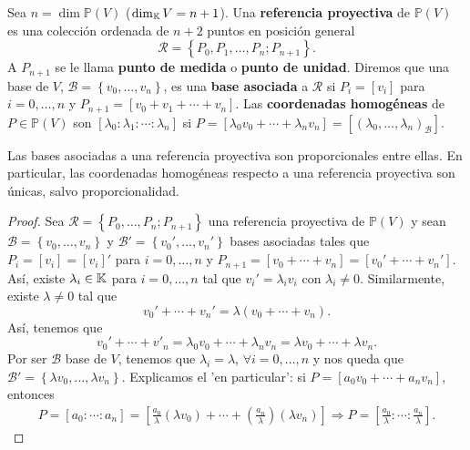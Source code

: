 \begin{definition}
Sea $\displaystyle n = \dim \mathbb{P}\left(V\right) $ ($\displaystyle \dim_{\mathbb{K}}V = n +1 $). Una \textbf{referencia proyectiva} de $\displaystyle \mathbb{P}\left(V\right) $ es una colección ordenada de $\displaystyle n + 2 $ puntos en posición general
\[\mathcal{R} = \left\{ P_{0}, P_{1}, \ldots, P_{n}; P_{n+1}\right\}  .\]
A $\displaystyle P_{n+1} $ se le llama \textbf{punto de medida} o \textbf{punto de unidad}. Diremos que una base de $\displaystyle V $, $\displaystyle \mathcal{B}= \left\{ v_{0}, \ldots, v_{n}\right\}  $, es una \textbf{base asociada} a $\displaystyle \mathcal{R} $ si $\displaystyle P_{i} = [v_{i}] $ para $\displaystyle  i = 0, \ldots, n $ y $\displaystyle P_{n+1} = \left[v_{0}+v_{1} + \cdots + v_{n}\right]  $. Las \textbf{coordenadas homogéneas} de $\displaystyle P \in \mathbb{P}\left(V\right) $ son $\displaystyle \left[\lambda_{0} : \lambda_{1} : \cdots : \lambda_{n}\right]  $ si $\displaystyle P = \left[\lambda_{0}v_{0}+\cdots + \lambda_{n}v_{n}\right] = [\left(\lambda_{0}, \ldots, \lambda_{n}\right)_{\mathcal{B}}]  $. 
\end{definition}
\begin{lema}
Las bases asociadas a una referencia proyectiva son proporcionales entre ellas. En particular, las coordenadas homogéneas respecto a una referencia proyectiva son únicas, salvo proporcionalidad. 
\end{lema}
\begin{proof}
	Sea $\displaystyle \mathcal{R} = \left\{ P_{0}, \ldots, P_{n}; P_{n+1}\right\}  $ una referencia proyectiva de $\displaystyle \mathbb{P}\left(V\right) $ y sean $\displaystyle \mathcal{B} = \left\{ v_{0}, \ldots, v_{n}\right\}  $ y $\displaystyle \mathcal{B}' = \left\{ v_{0}', \ldots, v_{n}'\right\}  $ bases asociadas tales que $\displaystyle P_{i} = \left[v_{i}\right]  = \left[v_{i}\right] ' $ para $\displaystyle i = 0, \ldots, n $ y $\displaystyle P_{n+1} = \left[v_{0}+\cdots + v_{n}\right] = \left[v_{0}' + \cdots + v_{n}'\right]  $. 
	Así, existe $\displaystyle \lambda_{i} \in \mathbb{K} $ para $\displaystyle i = 0, \ldots, n $ tal que $\displaystyle v_{i}' = \lambda_{i}v_{i} $ con $\displaystyle \lambda_{i} \neq 0 $. Similarmente, existe $\displaystyle \lambda\neq 0 $ tal que 
	\[v_{0}' + \cdots + v_{n}' = \lambda\left(v_{0} + \cdots + v_{n}\right) .\]
Así, tenemos que
\[v_{0}' + \cdots + v'_{n} = \lambda_{0}v_{0} + \cdots + \lambda_{n}v_{n} = \lambda v_{0} + \cdots + \lambda v_{n}.\]
Por ser $\displaystyle \mathcal{B} $ base de $\displaystyle V $, tenemos que $\displaystyle \lambda_{i} = \lambda  $, $\displaystyle \forall i = 0, \ldots, n $ y nos queda que $\displaystyle \mathcal{B}' = \left\{ \lambda v_{0}, \ldots, \lambda v_{n}\right\}  $. Explicamos el 'en particular': si $\displaystyle P = [a_{0}v_{0} + \cdots + a_{n}v_{n}] $, entonces  
\[
\begin{split}
	P = [a_{0} : \cdots : a_{n}] = \left[\frac{a_{0}}{\lambda }\left(\lambda v_{0}\right) + \cdots + \left(\frac{a_{n}}{\lambda }\right)\left(\lambda v_{n}\right)\right] \Rightarrow P = \left[\frac{a_{0}}{\lambda } : \cdots : \frac{a_{n}}{\lambda }\right] .
\end{split}
\]
\end{proof}
